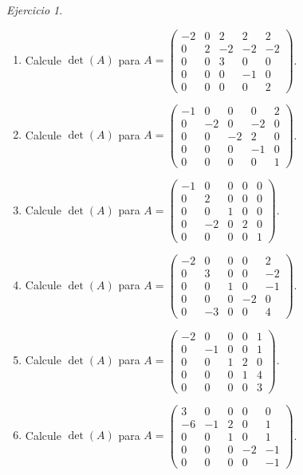 \documentclass[12pt]{article}
\theoremstyle{remark}
\newtheorem{Ejer}[definicion]{Ejercicio}
\begin{document}
\begin{Ejer}
\begin{enumerate}[start=163]
\item Calcule $\det(A)$ para $A=\begin{pmatrix}-2&0&2&2&2\\0&2&-2&-2&-2\\0&0&3&0&0\\0&0&0&-1&0\\0&0&0&0&2\end{pmatrix}$.

\item Calcule $\det(A)$ para $A=\begin{pmatrix}-1&0&0&0&2\\0&-2&0&-2&0\\0&0&-2&2&0\\0&0&0&-1&0\\0&0&0&0&1\end{pmatrix}$.

\item Calcule $\det(A)$ para $A=\begin{pmatrix}-1&0&0&0&0\\0&2&0&0&0\\0&0&1&0&0\\0&-2&0&2&0\\0&0&0&0&1\end{pmatrix}$.

\item Calcule $\det(A)$ para $A=\begin{pmatrix}-2&0&0&0&2\\0&3&0&0&-2\\0&0&1&0&-1\\0&0&0&-2&0\\0&-3&0&0&4\end{pmatrix}$.

\item Calcule $\det(A)$ para $A=\begin{pmatrix}-2&0&0&0&1\\0&-1&0&0&1\\0&0&1&2&0\\0&0&0&1&4\\0&0&0&0&3\end{pmatrix}$.

\item Calcule $\det(A)$ para $A=\begin{pmatrix}3&0&0&0&0\\-6&-1&2&0&1\\0&0&1&0&1\\0&0&0&-2&-1\\0&0&0&0&-1\end{pmatrix}$.

\end{enumerate}
\end{Ejer}
\end{document}

